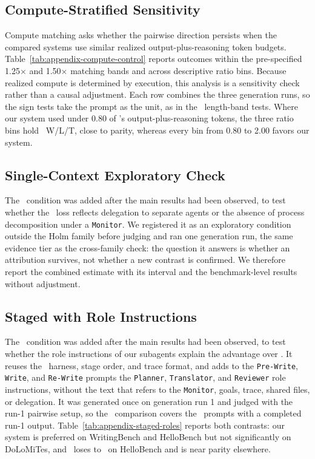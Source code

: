 \subsection{Compute-Stratified Sensitivity}
\label{app:compute-control}
Compute matching asks whether the pairwise direction persists when the compared systems use similar realized output-plus-reasoning token budgets.
Table~\ref{tab:appendix-compute-control} reports outcomes within the pre-specified 1.25$\times$ and 1.50$\times$ matching bands and across descriptive ratio bins.
Because realized compute is determined by execution, this analysis is a sensitivity check rather than a causal adjustment.
Each row combines the three generation runs, so the sign tests take the prompt as the unit, as in the \condSingleWriter\ length-band tests.
Where our system used under 0.80 of \condStaged's output-plus-reasoning tokens, the three ratio bins hold \ComputeFullStagedBelowEightyWLT\ W/L/T, close to parity, whereas every bin from 0.80 to 2.00 favors our system.

\clearpage

\subsection{Single-Context Exploratory Check}
\label{app:single-context}
The \condSingleContext\ condition was added after the main results had been observed, to test whether the \condSingleWriter\ loss reflects delegation to separate agents or the absence of process decomposition under a \texttt{Monitor}.
We registered it as an exploratory condition outside the Holm family before judging and ran one generation run, the same evidence tier as the cross-family check: the question it answers is whether an attribution survives, not whether a new contrast is confirmed.
We therefore report the combined estimate with its interval and the benchmark-level results without adjustment.


\subsection{Staged with Role Instructions}
\label{app:staged-roles}
The \condStagedRoles\ condition was added after the main results had been observed, to test whether the role instructions of our subagents explain the advantage over \condStaged.
It reuses the \condStaged\ harness, stage order, and trace format, and adds to the \texttt{Pre-Write}, \texttt{Write}, and \texttt{Re-Write} prompts the \texttt{Planner}, \texttt{Translator}, and \texttt{Reviewer} role instructions, without the text that refers to the \texttt{Monitor}, goals, trace, shared files, or delegation.
It was generated once on generation run 1 and judged with the run-1 pairwise setup, so the \condAgenticCogWriter\ comparison covers the \FullStagedRolesAcrossN\ prompts with a completed run-1 output.
Table~\ref{tab:appendix-staged-roles} reports both contrasts: our system is preferred on WritingBench and HelloBench but not significantly on DoLoMiTes, and \condStagedRoles\ loses to \condStaged\ on HelloBench and is near parity elsewhere.


